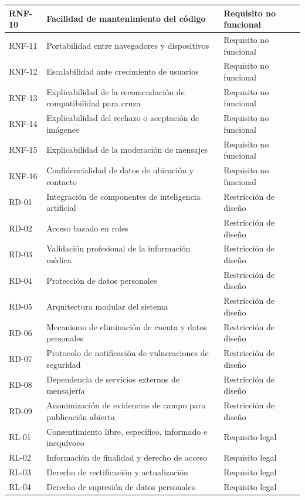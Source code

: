\documentclass[journal,onecolumn]{IEEEtran}
\begin{document}
\begin{longtable}{@{}p{2.2cm} p{7.5cm} p{3.5cm}@{}}
		\hline
		RNF-10 & Facilidad de mantenimiento del código & Requisito no funcional \\
		\hline
		RNF-11 & Portabilidad entre navegadores y dispositivos & Requisito no funcional \\
		\hline
		RNF-12 & Escalabilidad ante crecimiento de usuarios & Requisito no funcional \\
		\hline
		RNF-13 & Explicabilidad de la recomendación de compatibilidad para cruza & Requisito no funcional \\
		\hline
		RNF-14 & Explicabilidad del rechazo o aceptación de imágenes & Requisito no funcional \\
		\hline
		RNF-15 & Explicabilidad de la moderación de mensajes & Requisito no funcional \\
		\hline
		RNF-16 & Confidencialidad de datos de ubicación y contacto & Requisito no funcional \\
		\hline
		RD-01 & Integración de componentes de inteligencia artificial & Restricción de diseño \\
		\hline
		RD-02 & Acceso basado en roles & Restricción de diseño \\
		\hline
		RD-03 & Validación profesional de la información médica & Restricción de diseño \\
		\hline
		RD-04 & Protección de datos personales & Restricción de diseño \\
		\hline
		RD-05 & Arquitectura modular del sistema & Restricción de diseño \\
		\hline
		RD-06 & Mecanismo de eliminación de cuenta y datos personales & Restricción de diseño \\
		\hline
		RD-07 & Protocolo de notificación de vulneraciones de seguridad & Restricción de diseño \\
		\hline
		RD-08 & Dependencia de servicios externos de mensajería & Restricción de diseño \\
		\hline
		RD-09 & Anonimización de evidencias de campo para publicación abierta & Restricción de diseño \\
		\hline
		RL-01 & Consentimiento libre, específico, informado e inequívoco & Requisito legal \\
		\hline
		RL-02 & Información de finalidad y derecho de acceso & Requisito legal \\
		\hline
		RL-03 & Derecho de rectificación y actualización & Requisito legal \\
		\hline
		RL-04 & Derecho de supresión de datos personales & Requisito legal \\

\end{longtable}
\end{document}
